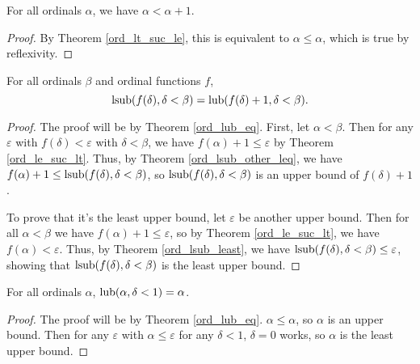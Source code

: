 \documentclass[../../math.tex]{subfiles}
\begin{document}
\begin{theorem} \label{ord_lt_suc}
    For all ordinals $\alpha$, we have $\alpha < \alpha + 1$.
\end{theorem}
\begin{proof}
    By Theorem \ref{ord_lt_suc_le}, this is equivalent to $\alpha \leq \alpha$,
    which is true by reflexivity.
\end{proof}

\begin{theorem} \label{ord_lsub_lub}
    For all ordinals $\beta$ and ordinal functions $f$,
    \[
        \operatorname{lsub}(f(\delta), \delta < \beta) = \operatorname{lub}(f(\delta) + 1, \delta < \beta).
    \]
\end{theorem}
\begin{proof}
    The proof will be by Theorem \ref{ord_lub_eq}.  First, let $\alpha < \beta$.
    Then for any $\varepsilon$ with $f(\delta) < \varepsilon$ with $\delta <
    \beta$, we have $f(\alpha) + 1 \leq \varepsilon$ by Theorem
    \ref{ord_le_suc_lt}.  Thus, by Theorem \ref{ord_lsub_other_leq}, we have
    $f(\alpha) + 1 \leq \operatorname{lsub}(f(\delta), \delta < \beta)$, so $\operatorname{lsub}(f(\delta),
    \delta < \beta)$ is an upper bound of $f(\delta) + 1$.

    To prove that it's the least upper bound, let $\varepsilon$ be another upper
    bound.  Then for all $\alpha < \beta$ we have $f(\alpha) + 1 \leq
    \varepsilon$, so by Theorem \ref{ord_le_suc_lt}, we have $f(\alpha) <
    \varepsilon$.  Thus, by Theorem \ref{ord_lsub_least}, we have
    $\operatorname{lsub}(f(\delta), \delta < \beta) \leq \varepsilon$, showing that
    $\operatorname{lsub}(f(\delta), \delta < \beta)$ is the least upper bound.
\end{proof}

\begin{theorem} \label{ord_lub_one}
    For all ordinals $\alpha$, $\operatorname{lub}(\alpha, \delta < 1) = \alpha$.
\end{theorem}
\begin{proof}
    The proof will be by Theorem \ref{ord_lub_eq}.  $\alpha \leq \alpha$, so
    $\alpha$ is an upper bound.  Then for any $\varepsilon$ with $\alpha \leq
    \varepsilon$ for any $\delta < 1$, $\delta = 0$ works, so $\alpha$ is the
    least upper bound.
\end{proof}
\end{document}
